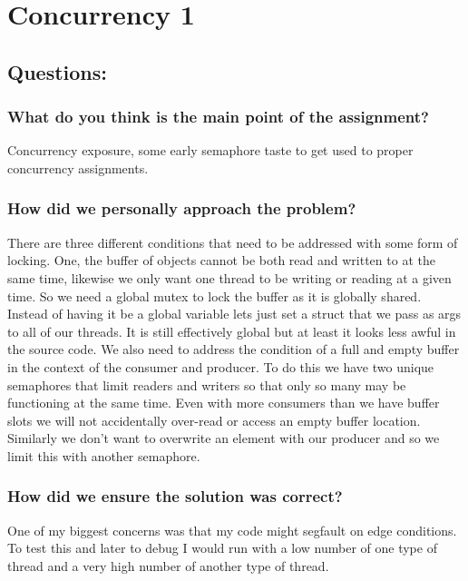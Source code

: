 \documentclass[letterpaper,10pt,notitlepage,fleqn]{article}
\begin{document}
\section{Concurrency 1}



\subsection{Questions:}
\subsubsection{What do you think is the main point of the assignment?}
Concurrency exposure, some early semaphore taste to get used to proper concurrency assignments. 


\subsubsection{How did we personally approach the problem?}
There are three different conditions that need to be addressed with some form of locking. One, the buffer of objects cannot be both read and written to at the same time, likewise we only want one thread to be writing or reading at a given time. So we need a global mutex to lock  the buffer as it is globally shared. Instead of having it be a global variable lets just set a struct that we pass as args to all of our threads. It is still effectively global but at least it looks less awful in the source code. We also need to address the condition of a full and empty buffer in the context of the consumer and producer. To do this we have two unique semaphores that limit readers and writers so that only so many may be functioning at the same time. Even with more consumers than we have buffer slots we will not accidentally over-read or access an empty buffer location. Similarly we don't want to overwrite an element with our producer and so we limit this with another semaphore.  

\subsubsection{How did we ensure the solution was correct?}
One of my biggest concerns was that my code might segfault on edge conditions. To test this and later to debug I would run with a low number of one type of thread and a very high number of another type of thread.
\end{document}
